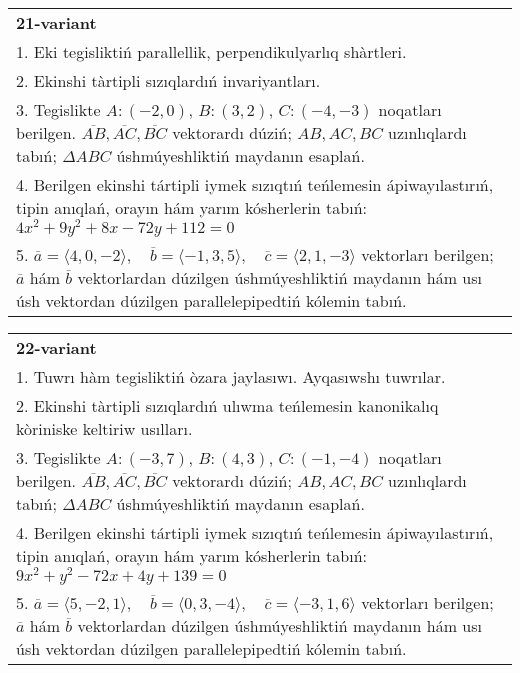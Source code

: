 \documentclass{article}
\begin{document}
\begin{tabular}{m{17cm}}
\textbf{21-variant}\\
1. Eki tegisliktiń parallellik, perpendikulyarlıq shàrtleri.\\

2. Ekinshi tàrtipli sızıqlardıń invariyantları.\\

3. Tegislikte $A: (-2, 0)$, $B: (3, 2)$, $C: (-4, -3)$ noqatları berilgen. $\overline{AB}, \overline{AC}, \overline{BC}$ vektorardı dúziń; $AB, AC, BC$ uzınlıqlardı tabıń; $\Delta ABC$ úshmúyeshliktiń maydanın esaplań. \\

4. Berilgen ekinshi tártipli iymek sızıqtıń teńlemesin ápiwayılastırıń, tipin anıqlań, orayın hám yarım kósherlerin tabıń: $4x^2+9y^2+8x-72y+112=0$\\

5. \(\overline{a} = \langle 4, 0, -2 \rangle, \quad \overline{b} = \langle -1, 3, 5 \rangle, \quad \overline{c} = \langle 2, 1, -3 \rangle\) vektorları berilgen; \(\overline{a}\) hám \(\overline{b}\) vektorlardan dúzilgen úshmúyeshliktiń maydanın hám usı úsh vektordan dúzilgen parallelepipedtiń kólemin tabıń.
\end{tabular}
\vspace{1cm}


\begin{tabular}{m{17cm}}
\textbf{22-variant}\\
1. Tuwrı hàm tegisliktiń òzara jaylasıwı. Ayqasıwshı tuwrılar.\\

2. Ekinshi tàrtipli sızıqlardıń ulıwma teńlemesin kanonikalıq kòriniske keltiriw usılları.\\

3. Tegislikte $A: (-3, 7)$, $B: (4, 3)$, $C: (-1, -4)$ noqatları berilgen. $\overline{AB}, \overline{AC}, \overline{BC}$ vektorardı dúziń; $AB, AC, BC$ uzınlıqlardı tabıń; $\Delta ABC$ úshmúyeshliktiń maydanın esaplań. \\

4. Berilgen ekinshi tártipli iymek sızıqtıń teńlemesin ápiwayılastırıń, tipin anıqlań, orayın hám yarım kósherlerin tabıń: $9x^2+y^2-72x+4y+139=0$\\

5. \(\overline{a} = \langle 5, -2, 1 \rangle, \quad \overline{b} = \langle 0, 3, -4 \rangle, \quad \overline{c} = \langle -3, 1, 6 \rangle\) vektorları berilgen; \(\overline{a}\) hám \(\overline{b}\) vektorlardan dúzilgen úshmúyeshliktiń maydanın hám usı úsh vektordan dúzilgen parallelepipedtiń kólemin tabıń.
\end{tabular}
\vspace{1cm}
\end{document}
